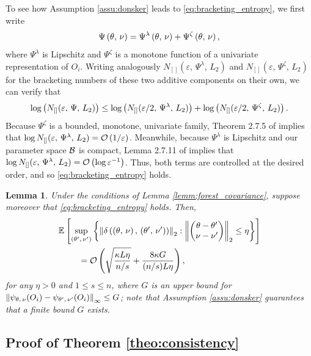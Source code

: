 \documentclass[aos]{imsart}
\theoremstyle{plain}
\newtheorem{lemm}[prop]{Lemma}
\theoremstyle{definition}
\theoremstyle{remark}
\begin{document}
\begin{CJK}{UTF8}{gbsn}
\begin{appendix}
To see how Assumption \ref{assu:donsker} leads to \eqref{eq:bracketing_entropy}, we first write
$$ \Psi\left(\theta, \, \nu\right) = \Psi^{\lambda}\left(\theta, \, \nu\right) + \Psi^{\zeta}\left(\theta, \, \nu\right), $$
where $\Psi^\lambda$ is Lipschitz and $\Psi^\zeta$ is a monotone function of
a univariate representation of $O_i$. Writing analogously $N_{[]}(\varepsilon, \, \Psi^\lambda, \, L_2)$
and $N_{[]}(\varepsilon, \, \Psi^\zeta, \, L_2)$ for the bracketing numbers of these two additive
components on their own, we can verify that
$$ \log\left(N_{[]}(\varepsilon, \, \Psi, \, L_2)\right) \leq
\log\left(N_{[]}(\varepsilon/2, \, \Psi^\lambda, \, L_2)\right) +\log\left(N_{[]}(\varepsilon/2, \, \Psi^\zeta, \, L_2)\right). $$
Because $\Psi^\zeta$ is a bounded,
monotone, univariate family, Theorem 2.7.5 of \citet{van1996weak} implies that
$\log N_{[]}(\varepsilon, \, \Psi^\lambda, \, L_2) = \mathcal{O}\left(1/\varepsilon\right)$.
Meanwhile, because $\Psi^\lambda$ is Lipschitz and our parameter space $\mathcal{B}$ is compact,
Lemma 2.7.11 of \citet{van1996weak} implies that
$\log N_{[]}(\varepsilon, \, \Psi^\lambda, \, L_2) = \mathcal{O}\left(\log \varepsilon^{-1}\right)$. Thus, both
terms are controlled at the desired order, and so \eqref{eq:bracketing_entropy} holds.


\begin{lemm}
\label{lemm:delta_conc}
Under the conditions of Lemma \ref{lemm:forest_covariance},
suppose moreover that \eqref{eq:bracketing_entropy} holds. Then,
\begin{equation}
\label{eq:discr_concentration}
\begin{split}
&\EE{\sup_{\p{\theta', \, \nu'}}\cb{\Norm{\delta\p{\p{\theta, \, \nu}, \, \p{\theta', \, \nu'}}}_2  : \Norm{\begin{pmatrix} \theta - \theta' \\ \nu - \nu' \end{pmatrix}}_2 \leq \eta}} \\
&\ \ \ \ \ \ \ = \oo\p{\sqrt{\frac{\kappa L \eta}{ n/s }} + \frac{8\kappa G}{ (n/s)  {L\eta}}},
\end{split}
\end{equation}
 for any $\eta > 0$ and $1 \leq s \leq n$, where
 $G$ is an upper bound for $\left\lVert\psi_{\theta, \, \nu}(O_i) - \psi_{\theta', \, \nu'}(O_i)\right\rVert_\infty \leq G$;
 note that Assumption \ref{assu:donsker} guarantees that a finite bound $G$ exists.
\end{lemm}


\subsection*{Proof of Theorem \ref{theo:consistency}}


\end{appendix}
\end{CJK}
\end{document}
